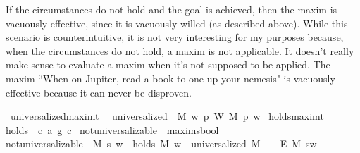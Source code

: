 \begin{isabellebody}
\begin{isamarkuptext}
If the circumstances do not hold and the goal is achieved, then the maxim is vacuously effective, since 
it is vacuously willed (as described above). While this scenario is counterintuitive, it is not very 
interesting for my purposes because, when the circumstances do not hold, a maxim is not applicable. It 
doesn't really make sense to evaluate a maxim when it's not supposed to be applied. The maxim ``When on Jupiter,
read a book to one-up your nemesis" is vacuously effective because it can never be disproven.%
\end{isamarkuptext}\isamarkuptrue%
\isamarkupfalse%
\ universalized{\isacharcolon}{\isacharcolon}{\isachardoublequoteopen}maxim{\isasymRightarrow}t{\isachardoublequoteclose}\ \ \isanewline
{\isachardoublequoteopen}universalized\ {\isasymequiv}\ {\isasymlambda}M{\isachardot}\ {\isacharparenleft}{\isasymlambda}w{\isachardot}\ {\isacharparenleft}{\isasymforall}p{\isachardot}\ W\ M\ p\ w{\isacharparenright}{\isacharparenright}{\isachardoublequoteclose}\isanewline
\isanewline
{}\isamarkupfalse%
\ holds{\isacharcolon}{\isacharcolon}{\isachardoublequoteopen}maxim{\isasymRightarrow}t{\isachardoublequoteclose}\ \ \isanewline
{\isachardoublequoteopen}holds\ {\isasymequiv}\ {\isasymlambda}{\isacharparenleft}c{\isacharcomma}\ a{\isacharcomma}\ g{\isacharparenright}{\isachardot}\ c{\isachardoublequoteclose}\isanewline
\isanewline
{}\isamarkupfalse%
\ not{\isacharunderscore}universalizable\ {\isacharcolon}{\isacharcolon}\ {\isachardoublequoteopen}maxim{\isasymRightarrow}s{\isasymRightarrow}bool{\isachardoublequoteclose}\ \ \isanewline
{\isachardoublequoteopen}not{\isacharunderscore}universalizable\ {\isasymequiv}\ {\isasymlambda}M\ s{\isachardot}\ {\isasymforall}w{\isachardot}\ {\isacharparenleft}{\isasymnot}\ {\isacharparenleft}holds\ M\ w{\isacharparenright}{\isacharparenright}\ {\isasymor}\ {\isacharparenleft}universalized\ M\ \ \isactrlbold {\isasymrightarrow}\ {\isacharparenleft}\isactrlbold {\isasymnot}\ {\isacharparenleft}E\ M\ s{\isacharparenright}{\isacharparenright}{\isacharparenright}w{\isachardoublequoteclose}\isanewline
%
\end{isabellebody}
